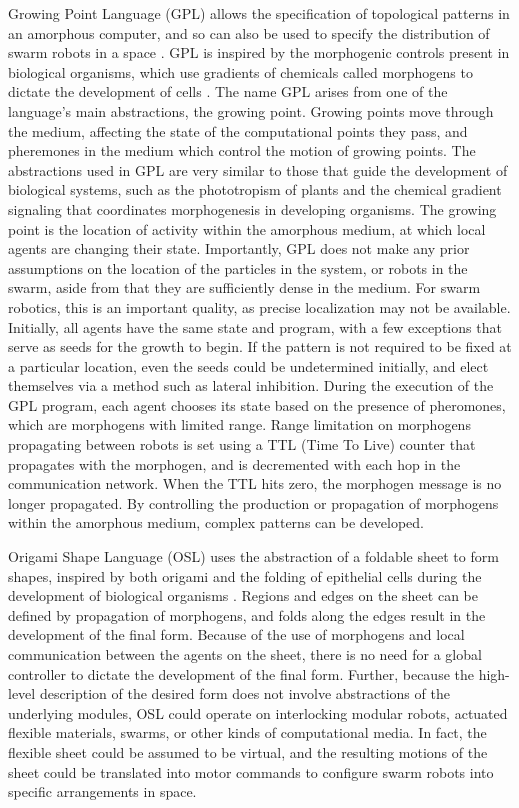 \documentclass[]{article}
\begin{document}
Growing Point Language (GPL) allows the specification of topological patterns in an amorphous computer, and so can also be used to specify the distribution of swarm robots in a space \cite{nagpal2004engineering}. 
GPL is inspired by the morphogenic controls present in biological organisms, which use gradients of chemicals called morphogens to dictate the development of cells \cite{turing1952chemical}.
The name GPL arises from one of the language's main abstractions, the growing point. 
Growing points move through the medium, affecting the state of the computational points they pass, and pheremones in the medium which control the motion of growing points.
The abstractions used in GPL are very similar to those that guide the development of biological systems, such as the phototropism of plants and the chemical gradient signaling that coordinates morphogenesis in developing organisms.   
The growing point is the location of activity within the amorphous medium, at which local agents are changing their state. 
Importantly, GPL does not make any prior assumptions on the location of the particles in the system, or robots in the swarm, aside from that they are sufficiently dense in the medium. 
For swarm robotics, this is an important quality, as precise localization may not be available. 
Initially, all agents have the same state and program, with a few exceptions that serve as seeds for the growth to begin. 
If the pattern is not required to be fixed at a particular location, even the seeds could be undetermined initially, and elect themselves via a method such as lateral inhibition. 
During the execution of the GPL program, each agent chooses its state based on the presence of pheromones, which are morphogens with limited range. 
Range limitation on morphogens propagating between robots is set using a TTL (Time To Live) counter that propagates with the morphogen, and is decremented with each hop in the communication network. 
When the TTL hits zero, the morphogen message is no longer propagated. 
By controlling the production or propagation of morphogens within the amorphous medium, complex patterns can be developed. 

Origami Shape Language (OSL) uses the abstraction of a foldable sheet to form shapes, inspired by both origami and the folding of epithelial cells during the development of biological organisms \cite{nagpal2004engineering, nagpal2001programmable}.
Regions and edges on the sheet can be defined by propagation of morphogens, and folds along the edges result in the development of the final form.
Because of the use of morphogens and local communication between the agents on the sheet, there is no need for a global controller to dictate the development of the final form. 
Further, because the high-level description of the desired form does not involve abstractions of the underlying modules, OSL could operate on interlocking modular robots, actuated flexible materials, swarms, or other kinds of computational media. 
In fact, the flexible sheet could be assumed to be virtual, and the resulting motions of the sheet could be translated into motor commands to configure swarm robots into specific arrangements in space. 
\end{document}
